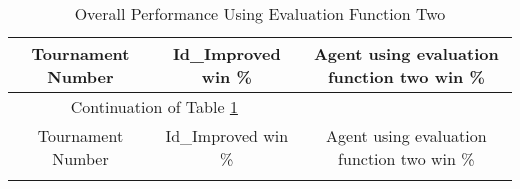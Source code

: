 \documentclass[11pt]{article}
\begin{document}
 \begin{longtable}[c]{| c | c |c |}
 \caption{Overall Performance Using Evaluation Function Two\label{eval_fun2_overall}}\\
 \hline
 \hline
 Tournament Number & Id\_Improved win \% & Agent using evaluation function two win \% \\
 \hline
 \endfirsthead
 
 \hline
 \multicolumn{2}{|c|}{Continuation of Table \ref{eval_fun2_overall}}\\ 
 \hline
 Tournament Number & Id\_Improved win \% & Agent using evaluation function two win \% \\
 \hline
 \endhead
 
 \hline
 \endfoot
 

\end{longtable}
\end{document}
